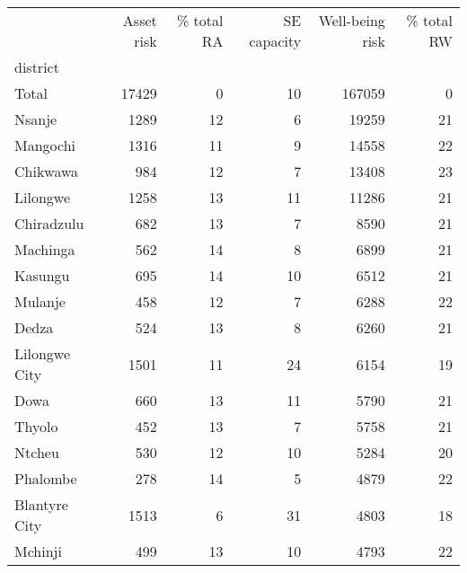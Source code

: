 \begin{tabular}{lrrrrr}
\toprule
{} &  Asset risk &  \% total RA &  SE capacity &  Well-being risk &  \% total RW \\
district      &             &             &              &                  &             \\
\midrule
Total         &       17429 &           0 &           10 &           167059 &           0 \\
Nsanje        &        1289 &          12 &            6 &            19259 &          21 \\
Mangochi      &        1316 &          11 &            9 &            14558 &          22 \\
Chikwawa      &         984 &          12 &            7 &            13408 &          23 \\
Lilongwe      &        1258 &          13 &           11 &            11286 &          21 \\
Chiradzulu    &         682 &          13 &            7 &             8590 &          21 \\
Machinga      &         562 &          14 &            8 &             6899 &          21 \\
Kasungu       &         695 &          14 &           10 &             6512 &          21 \\
Mulanje       &         458 &          12 &            7 &             6288 &          22 \\
Dedza         &         524 &          13 &            8 &             6260 &          21 \\
Lilongwe City &        1501 &          11 &           24 &             6154 &          19 \\
Dowa          &         660 &          13 &           11 &             5790 &          21 \\
Thyolo        &         452 &          13 &            7 &             5758 &          21 \\
Ntcheu        &         530 &          12 &           10 &             5284 &          20 \\
Phalombe      &         278 &          14 &            5 &             4879 &          22 \\
Blantyre City &        1513 &           6 &           31 &             4803 &          18 \\
Mchinji       &         499 &          13 &           10 &             4793 &          22 \\

\end{tabular}
